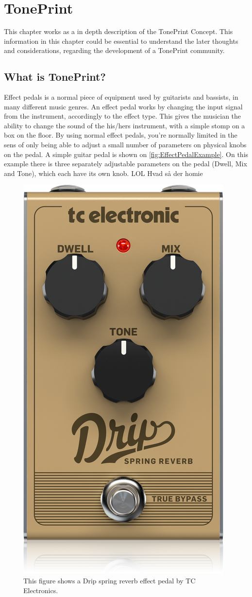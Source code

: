 \chapter{TonePrint}
\label{TonePrintConcept}

This chapter works as a in depth description of the TonePrint Concept. This information in this chapter could be essential to understand the later thoughts and considerations, regarding the development of a TonePrint community.

\section{What is TonePrint?}
\label{WhatIsTonePrint}

Effect pedals is a normal piece of equipment used by guitarists and bassists, in many different music genres. An effect pedal works by changing the input signal from the instrument, accordingly to the effect type. This gives the musician the ability to change the sound of the his/hers instrument, with a simple stomp on a box on the floor. By using normal effect pedals, you're normally limited in the sens of only being able to adjust a small number of parameters on physical knobs on the pedal. A simple guitar pedal is shown on \autoref{fig:EffectPedalExample}. On this example there is three separately adjustable parameters on the pedal (Dwell, Mix and Tone), which each have its own knob. LOL Hvad så der homie

\begin{figure}
	\centering
	\includegraphics[width=.25\textwidth]{Graphics/EffectPedalExample}
	 \caption{This figure shows a Drip spring reverb effect pedal by TC Electronics.}
    \label{fig:EffectPedalExample}
\end{figure}

